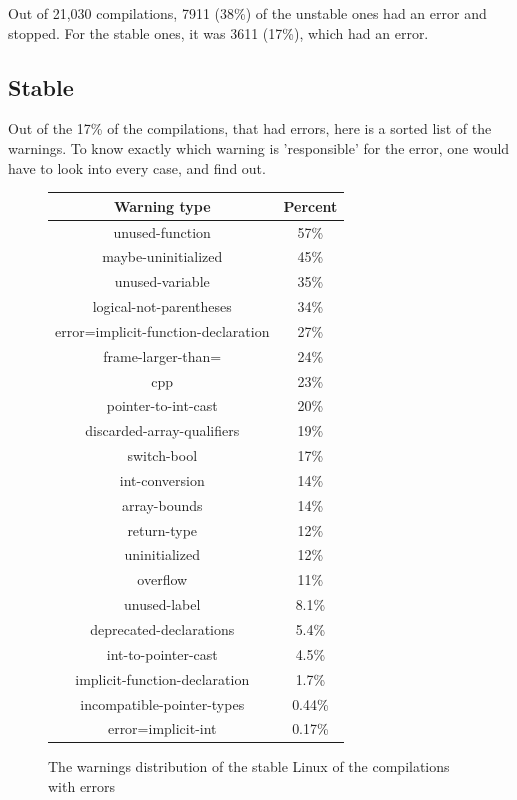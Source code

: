 \documentclass[a4paper,11pt]{report}
\newcommand{\figa}{
    \begin{figure}[!htpb]
    \centering
}
\newcommand{\figb}[2]{
    \caption{#1}
    \label{#2}
    \end{figure}
}
\begin{document}
Out of 21,030 compilations, 7911 (38\%) of the unstable ones had an error and 
stopped. For the stable ones, it was 3611 (17\%), which had an error.

    \subsection{Stable}

Out of the 17\% of the compilations, that had errors, here is a sorted list of 
the warnings. To know exactly which warning is 'responsible' for the error, 
one would have to look into every case, and find out.


\figa
    \begin{tabular}{c|c}
        \hline 
        \hline

        \textbf{Warning type} & \textbf{Percent} \\

        \hline

        unused-function & 57\% \\
        maybe-uninitialized & 45\% \\
        unused-variable & 35\% \\
        logical-not-parentheses & 34\% \\
        error=implicit-function-declaration & 27\% \\
        frame-larger-than= & 24\% \\
        cpp & 23\% \\
        pointer-to-int-cast & 20\% \\
        discarded-array-qualifiers & 19\% \\
        switch-bool & 17\% \\
        int-conversion & 14\% \\
        array-bounds & 14\% \\
        return-type & 12\% \\
        uninitialized & 12\% \\
        overflow & 11\% \\
        unused-label & 8.1\% \\
        deprecated-declarations & 5.4\% \\
        int-to-pointer-cast & 4.5\% \\
        implicit-function-declaration & 1.7\% \\
        incompatible-pointer-types & 0.44\% \\
        error=implicit-int & 0.17\% \\

        \hline 
        \hline
    \end{tabular}
\figb{The warnings distribution of the stable Linux of the compilations with 
    errors}{tab:stablewarnwitherrs}
\end{document}
